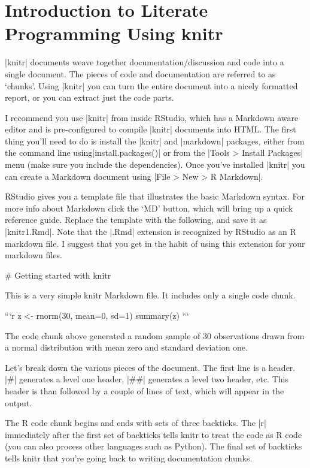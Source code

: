 \section{Introduction to Literate Programming Using knitr}



|knitr| documents weave together documentation/discussion and code into a
single document. The pieces of code and documentation are referred to as
`chunks'. Using |knitr| you can turn the entire document into a nicely formatted report, or you can extract just the code parts.

I recommend you use |knitr| from inside RStudio, which has a Markdown aware editor and is pre-configured to compile |knitr| documents into HTML. The first thing you'll need to do is install the |knitr| and |markdown| packages, either from the command line using|install.packages()| or from the |Tools > Install Packages| menu (make sure you include the dependencies). Once you've installed |knitr| you can create a Markdown document using |File > New > R Markdown|.

RStudio gives you a template  file that illustrates the basic Markdown syntax.  For more info about Markdown click the `MD' button, which will bring up a quick reference guide.  Replace the template with the following, and save it as |knitr1.Rmd|. Note that the |.Rmd| extension is recognized by RStudio as an R markdown file. I suggest that you get in the habit of using this extension for your markdown files.

\begin{codeblock}
# Getting started with knitr

This is a very simple knitr Markdown file. It includes only a single
code chunk.

```{r}
z <- rnorm(30, mean=0, sd=1)
summary(z)
```

The code chunk above generated a random sample of 30 observations
drawn from a normal distribution with mean zero and standard
deviation one.
\end{codeblock}

Let's break down the various pieces of the document. The first line is a header.  |#| generates a level one header, |##| generates a level two header, etc.  This header is than followed by a couple of lines of text, which will appear in the output.

The R code chunk begins and ends with sets of three backticks.  The |{r}| immediately after the first set of backticks tells knitr to treat  the code as R code (you can also process other languages such as Python). The final set of backticks tells knitr that you're going back to writing documentation
chunks.

